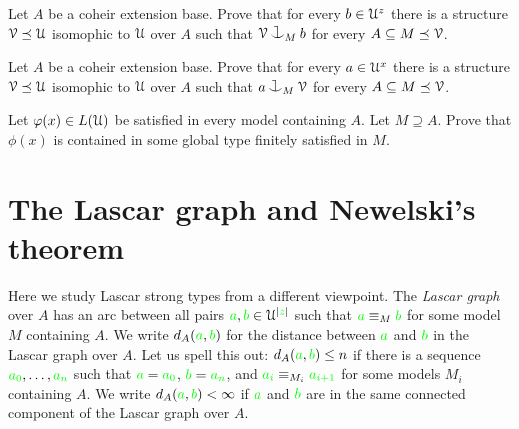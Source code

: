 \documentclass[creche.tex]{subfiles}
\begin{document}
\begin{exercise}
  Let $A$ be a coheir extension base.
  Prove that for every $b\in\EuScript U^z$ there is a structure $\EuScript V\preceq\EuScript U$ isomophic to $\EuScript U$ over $A$ such that $\V\cnonfork_Mb$ for every $A\subseteq M\preceq\EuScript V$.\QED
\end{exercise}

\begin{exercise}
  Let $A$ be a coheir extension base.
  Prove that for every $a\in\EuScript U^x$ there is a structure $\EuScript V\preceq\EuScript U$ isomophic to $\EuScript U$ over $A$ such that $a\cnonfork_M\V$ for every $A\subseteq M\preceq\EuScript V$.\QED
\end{exercise}


\begin{exercise}
  Let $\varphi(x)\in L(\EuScript U)$ be satisfied in every model containing $A$.  
  Let $M\supseteq A$.  
  Prove that $\phi(x)$ is contained in some global type finitely satisfied in $M$.\QED
\end{exercise}


\section{The Lascar graph and Newelski's theorem}\label{newelski}

Here we study Lascar strong types from a different viewpoint. The \emph{Lascar graph\/} over $A$ has an arc between all pairs ${\color{green} a},{\color{green} b}\in \EuScript U^{|{\color{green} z}|}$ such that  ${\color{green} a}\equiv_M{\color{green} b}$ for some model $M$ containing $A$. We write \emph{$d_A({\color{green} a},{\color{green} b})$\/} for the distance between ${\color{green} a}$ and ${\color{green} b}$ in the Lascar graph over $A$. Let us spell this out: $d_A({\color{green} a},{\color{green} b})\le n$ if there is a sequence ${\color{green} a_0},\dots,{\color{green} a_n}$ such that ${\color{green} a}={\color{green} a_0}$, ${\color{green} b}={\color{green} a_n}$, and ${\color{green} a_i}\equiv_{M_i}{\color{green} a_{i+1}}$ for some models $M_i$ containing $A$. We write \emph{$d_A({\color{green} a},{\color{green} b})<\infty$\/} if ${\color{green} a}$ and ${\color{green} b}$ are in the same connected component of the Lascar graph over $A$.
\end{document}
